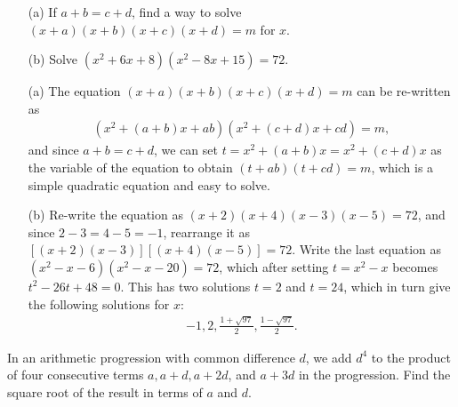 \begin{tcolorbox}
\begin{question}
\begin{itemize}
    \item[(a)] If $a+b=c+d$, find a way to solve $(x+a)(x+b)(x+c)(x+d)=m$ for $x$.
    \item[(b)] Solve $(x^2+6x+8)(x^2-8x+15)=72$.
\end{itemize}
\end{question}
\end{tcolorbox}

\begin{solution}[name=Solution by Parviz Shahriari]
\begin{itemize}
    \item[(a)] The equation $(x+a)(x+b)(x+c)(x+d)=m$ can be re-written as
    \begin{align*}
        (x^2+(a+b)x+ab)(x^2+(c+d)x+cd)=m,
    \end{align*}
    and since $a+b=c+d$, we can set $t = x^2+(a+b)x = x^2 + (c+d)x$ as the variable of the equation to obtain $(t+ab)(t+cd)=m$, which is a simple quadratic equation and easy to solve.
    \item[(b)] Re-write the equation as $(x+2)(x+4)(x-3)(x-5)=72$, and since $2-3=4-5=-1$, rearrange it as $\left[(x+2)(x-3)\right] \left[(x+4)(x-5)\right]=72$. Write the last equation as $(x^2-x-6)(x^2-x-20)=72$, which after setting $t=x^2-x$ becomes $t^2-26t+48=0$. This has two solutions $t=2$ and $t=24$, which in turn give the following solutions for $x$:
    \begin{align*}
        -1, 2, \frac{1+\sqrt{97}}{2}, \frac{1-\sqrt{97}}{2}.
    \end{align*}
\end{itemize}
\end{solution}


\begin{tcolorbox}
\begin{question}
In an arithmetic progression with common difference $d$, we add $d^4$ to the product of four consecutive terms $a,a+d,a+2d$, and $a+3d$ in the progression. Find the square root of the result in terms of $a$ and $d$.
\end{question}
\end{tcolorbox}

